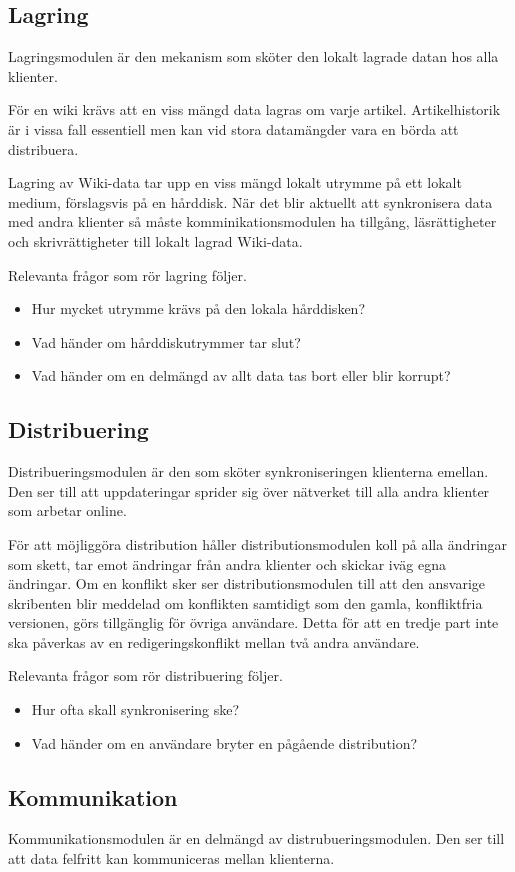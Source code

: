 \subsection{Lagring}
Lagringsmodulen är den mekanism som sköter den lokalt lagrade datan hos alla klienter.

För en wiki krävs att en viss mängd data lagras om varje artikel. Artikelhistorik är i vissa fall essentiell men kan vid stora datamängder vara en börda att distribuera.

Lagring av Wiki-data tar upp en viss mängd lokalt utrymme på ett lokalt medium, förslagsvis på en hårddisk. När det blir aktuellt att synkronisera data med andra klienter så måste komminikationsmodulen ha tillgång, läsrättigheter och skrivrättigheter till lokalt lagrad Wiki-data.

Relevanta frågor som rör lagring följer.
\begin{itemize}
\item Hur mycket utrymme krävs på den lokala hårddisken?
\item Vad händer om hårddiskutrymmer tar slut?
\item Vad händer om en delmängd av allt data tas bort eller blir korrupt?
\end{itemize}
\subsection{Distribuering}
Distribueringsmodulen är den som sköter synkroniseringen klienterna emellan. Den ser till att uppdateringar sprider sig över nätverket till alla andra klienter som arbetar online.

För att möjliggöra distribution håller distributionsmodulen koll på alla ändringar som skett, tar emot ändringar från andra klienter och skickar iväg egna ändringar. Om en konflikt sker ser distributionsmodulen till att den ansvarige skribenten blir meddelad om konflikten samtidigt som den gamla, konfliktfria versionen, görs tillgänglig för övriga användare. Detta för att en tredje part inte ska påverkas av en redigeringskonflikt mellan två andra användare.

Relevanta frågor som rör distribuering följer.
\begin{itemize}
\item Hur ofta skall synkronisering ske?
\item Vad händer om en användare bryter en pågående distribution?
\end{itemize}
\subsection{Kommunikation}
Kommunikationsmodulen är en delmängd av distrubueringsmodulen. Den ser till att data felfritt kan kommuniceras mellan klienterna.

